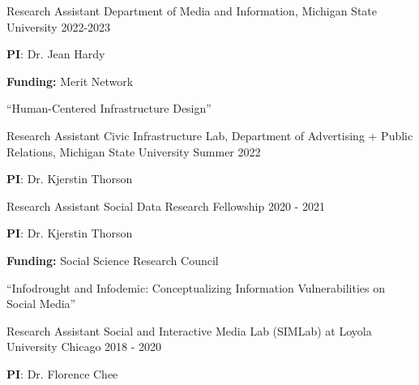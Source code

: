 

\begin{cventries}

        \cventry
    {Research Assistant} %
    {Department of Media and Information,  Michigan State University } %
    {} %
    {2022-2023} %
    {
      \begin{cvitems} %
              \item {\textbf{PI}: Dr. Jean Hardy}
               \item {\textbf{Funding: }Merit Network}
                \item {“Human-Centered Infrastructure Design”}
      \end{cvitems}
    }
  
    \cventry
    {Research Assistant} %
    {Civic Infrastructure Lab, Department of Advertising + Public Relations, Michigan State University } %
    {} %
    {Summer 2022} %
    {
      \begin{cvitems} %
              \item {\textbf{PI}: Dr. Kjerstin Thorson}
      \end{cvitems}
    }
  
  \cventry
    {Research Assistant} %
    {Social Data Research Fellowship} %
    {} %
    {2020 - 2021} %
    {
      \begin{cvitems} %
              \item {\textbf{PI}: Dr. Kjerstin Thorson}
                \item {\textbf{Funding: }Social Science Research Council}
                \item {“Infodrought and Infodemic: Conceptualizing Information Vulnerabilities on Social Media”}
      \end{cvitems}
    }

    \cventry
    {Research Assistant} %
    {Social and Interactive Media Lab (SIMLab) at Loyola University Chicago} %
    {} %
    {2018 - 2020} %
    {
      \begin{cvitems} %
        \item {\textbf{PI}: Dr. Florence Chee}
      \end{cvitems}
    }
    

\end{cventries}
